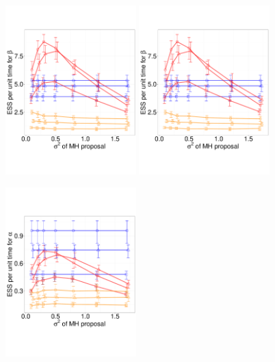 {%
  \begin{figure}%
  \centering
  \begin{minipage}[hp]{0.9\linewidth}
  \centering
    \includegraphics [width=0.45\textwidth, angle=0]{figs/q_3_alpha.pdf}
    \hspace{.2in}
    \includegraphics [width=0.45\textwidth, angle=0]{figs/q_3_beta.pdf}
    \vspace{-1.0 in}
  \end{minipage}
  \begin{minipage}[!hp]{0.9\linewidth}
  \centering
    \includegraphics [width=0.45\textwidth, angle=0]{figs/q_10_alpha.pdf}

\end{minipage}
\end{figure}}
